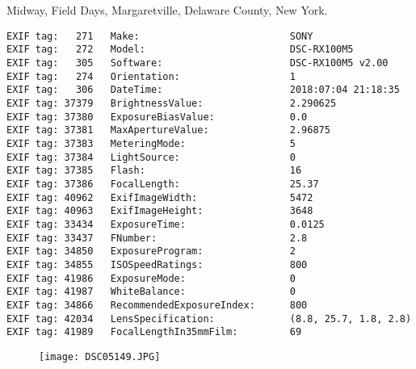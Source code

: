 \section{\protect{}}
\noindent Midway, Field Days, Margaretville, Delaware County, New York.
\noindent
\begin{lstlisting}
EXIF tag:   271   Make:                          SONY
EXIF tag:   272   Model:                         DSC-RX100M5
EXIF tag:   305   Software:                      DSC-RX100M5 v2.00
EXIF tag:   274   Orientation:                   1
EXIF tag:   306   DateTime:                      2018:07:04 21:18:35
EXIF tag: 37379   BrightnessValue:               2.290625
EXIF tag: 37380   ExposureBiasValue:             0.0
EXIF tag: 37381   MaxApertureValue:              2.96875
EXIF tag: 37383   MeteringMode:                  5
EXIF tag: 37384   LightSource:                   0
EXIF tag: 37385   Flash:                         16
EXIF tag: 37386   FocalLength:                   25.37
EXIF tag: 40962   ExifImageWidth:                5472
EXIF tag: 40963   ExifImageHeight:               3648
EXIF tag: 33434   ExposureTime:                  0.0125
EXIF tag: 33437   FNumber:                       2.8
EXIF tag: 34850   ExposureProgram:               2
EXIF tag: 34855   ISOSpeedRatings:               800
EXIF tag: 41986   ExposureMode:                  0
EXIF tag: 41987   WhiteBalance:                  0
EXIF tag: 34866   RecommendedExposureIndex:      800
EXIF tag: 42034   LensSpecification:             (8.8, 25.7, 1.8, 2.8)
EXIF tag: 41989   FocalLengthIn35mmFilm:         69

\end{lstlisting}
\clearpage
\begin{figure}
\raggedleft
\texttt{[image: DSC05149.JPG]}
\end{figure}


\clearpage
